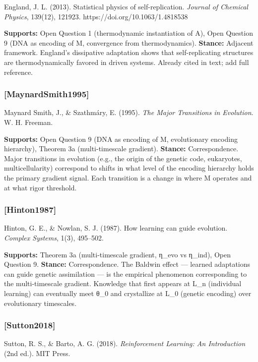\documentclass[
]{article}
\begin{document}
England, J. L. (2013). Statistical physics of self-replication.
\emph{Journal of Chemical Physics}, 139(12), 121923.
https://doi.org/10.1063/1.4818538

\textbf{Supports:} Open Question 1 (thermodynamic instantiation of A),
Open Question 9 (DNA as encoding of M, convergence from thermodynamics).
\textbf{Stance:} Adjacent framework. England's dissipative adaptation
shows that self-replicating structures are thermodynamically favored in
driven systems. Already cited in text; add full reference.

\subsubsection{{[}MaynardSmith1995{]}}\label{maynardsmith1995}

Maynard Smith, J., \& Szathmáry, E. (1995). \emph{The Major Transitions
in Evolution}. W. H. Freeman.

\textbf{Supports:} Open Question 9 (DNA as encoding of M, evolutionary
encoding hierarchy), Theorem 3a (multi-timescale gradient).
\textbf{Stance:} Correspondence. Major transitions in evolution (e.g.,
the origin of the genetic code, eukaryotes, multicellularity) correspond
to shifts in what level of the encoding hierarchy holds the primary
gradient signal. Each transition is a change in where M operates and at
what rigor threshold.

\subsubsection{{[}Hinton1987{]}}\label{hinton1987}

Hinton, G. E., \& Nowlan, S. J. (1987). How learning can guide
evolution. \emph{Complex Systems}, 1(3), 495--502.

\textbf{Supports:} Theorem 3a (multi-timescale gradient, η\_evo vs
η\_ind), Open Question 9. \textbf{Stance:} Correspondence. The Baldwin
effect --- learned adaptations can guide genetic assimilation --- is the
empirical phenomenon corresponding to the multi-timescale gradient.
Knowledge that first appears at L\_n (individual learning) can
eventually meet θ\_0 and crystallize at L\_0 (genetic encoding) over
evolutionary timescales.

\subsubsection{{[}Sutton2018{]}}\label{sutton2018}

Sutton, R. S., \& Barto, A. G. (2018). \emph{Reinforcement Learning: An
Introduction} (2nd ed.). MIT Press.
\end{document}
